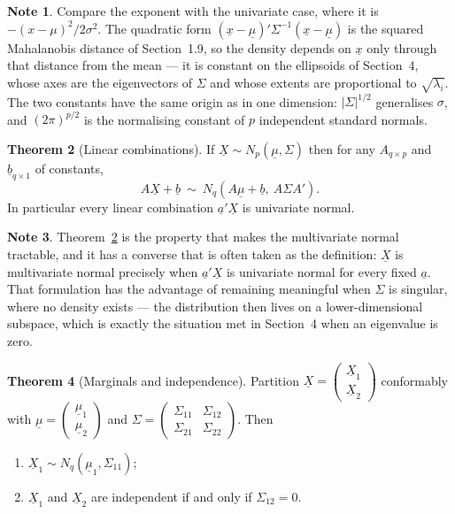 \documentclass[11pt,a4paper]{article}
\theoremstyle{definition}
\newtheorem{thm}{Theorem}[section]
\newtheorem{note}[thm]{Note}
\begin{document}
\begin{note}
Compare the exponent with the univariate case, where it is
$-\left(x-\mu\right)^{2}/2\sigma^{2}$. The quadratic form
$\left(\underline{x}-\underline{\mu}\right)'\Sigma^{-1}
\left(\underline{x}-\underline{\mu}\right)$ is the squared Mahalanobis distance
of Section~1.9, so the density depends on $\underline{x}$ only through that
distance from the mean --- it is constant on the ellipsoids of Section~4, whose
axes are the eigenvectors of $\Sigma$ and whose extents are proportional to
$\sqrt{\lambda_i}$. The two constants have the same origin as in one dimension:
$\left|\Sigma\right|^{1/2}$ generalises $\sigma$, and $(2\pi)^{p/2}$ is the
normalising constant of $p$ independent standard normals.
\end{note}

\begin{thm}[Linear combinations]
\label{thm:mvnlinear}
If $\underline{X}\sim N_p(\underline{\mu},\Sigma)$ then for any
$A_{q\times p}$ and $\underline{b}_{q\times1}$ of constants,
$$A\underline{X}+\underline{b}\ \sim\
N_q\left(A\underline{\mu}+\underline{b},\ A\Sigma A'\right).$$
In particular every linear combination
$\underline{a}'\underline{X}$ is univariate normal.
\end{thm}

\begin{note}
Theorem~\ref{thm:mvnlinear} is the property that makes the multivariate normal
tractable, and it has a converse that is often taken as the definition:
$\underline{X}$ is multivariate normal precisely when $\underline{a}'\underline{X}$
is univariate normal for every fixed $\underline{a}$. That formulation has the
advantage of remaining meaningful when $\Sigma$ is singular, where no density
exists --- the distribution then lives on a lower-dimensional subspace, which is
exactly the situation met in Section~4 when an eigenvalue is zero.
\end{note}

\begin{thm}[Marginals and independence]
\label{thm:mvnmarg}
Partition $\underline{X} = \begin{pmatrix}\underline{X}_1\\ \underline{X}_2\end{pmatrix}$
conformably with
$\underline{\mu} = \begin{pmatrix}\underline{\mu}_1\\ \underline{\mu}_2\end{pmatrix}$
and
$\Sigma = \begin{pmatrix}\Sigma_{11} & \Sigma_{12}\\ \Sigma_{21} & \Sigma_{22}\end{pmatrix}$.
Then
\begin{enumerate}
\item[(i)] $\underline{X}_1 \sim N_{q}\left(\underline{\mu}_1,\Sigma_{11}\right)$;
\item[(ii)] $\underline{X}_1$ and $\underline{X}_2$ are independent if and only
if $\Sigma_{12}=0$.
\end{enumerate}
\end{thm}
\end{document}
